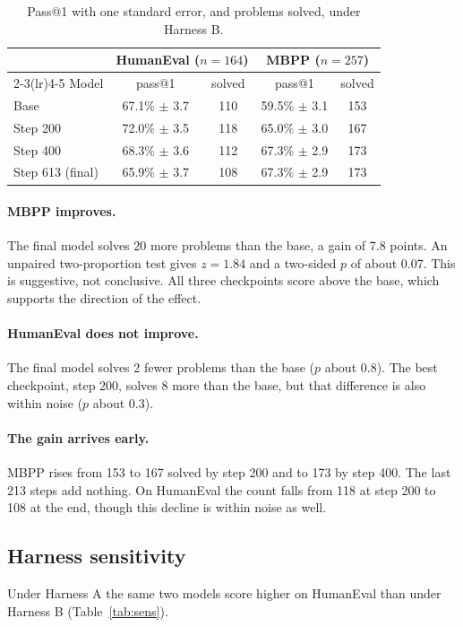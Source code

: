 \documentclass[11pt,a4paper]{article}
\begin{document}
\begin{table}[h]
\centering
\begin{tabular}{lcccc}
\toprule
 & \multicolumn{2}{c}{HumanEval ($n=164$)} & \multicolumn{2}{c}{MBPP ($n=257$)} \\
\cmidrule(lr){2-3}\cmidrule(lr){4-5}
Model & pass@1 & solved & pass@1 & solved \\
\midrule
Base & 67.1\% $\pm$ 3.7 & 110 & 59.5\% $\pm$ 3.1 & 153 \\
Step 200 & 72.0\% $\pm$ 3.5 & 118 & 65.0\% $\pm$ 3.0 & 167 \\
Step 400 & 68.3\% $\pm$ 3.6 & 112 & 67.3\% $\pm$ 2.9 & 173 \\
Step 613 (final) & 65.9\% $\pm$ 3.7 & 108 & 67.3\% $\pm$ 2.9 & 173 \\
\bottomrule
\end{tabular}
\caption{Pass@1 with one standard error, and problems solved, under Harness B.}
\label{tab:main}
\end{table}

\paragraph{MBPP improves.} The final model solves 20 more problems than the base, a gain of 7.8 points. An unpaired two-proportion test gives $z=1.84$ and a two-sided $p$ of about 0.07. This is suggestive, not conclusive. All three checkpoints score above the base, which supports the direction of the effect.

\paragraph{HumanEval does not improve.} The final model solves 2 fewer problems than the base ($p$ about 0.8). The best checkpoint, step 200, solves 8 more than the base, but that difference is also within noise ($p$ about 0.3).

\paragraph{The gain arrives early.} MBPP rises from 153 to 167 solved by step 200 and to 173 by step 400. The last 213 steps add nothing. On HumanEval the count falls from 118 at step 200 to 108 at the end, though this decline is within noise as well.

\subsection{Harness sensitivity}
Under Harness A the same two models score higher on HumanEval than under Harness B (Table~\ref{tab:sens}).
\end{document}
